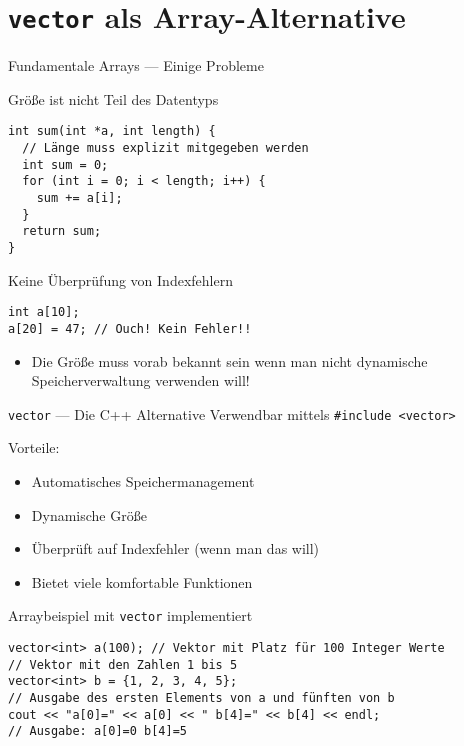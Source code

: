\documentclass[presentation]{beamer}
\begin{document}
\section{\texttt{vector} als Array-Alternative}
\label{sec:org3bbdcd3}
\begin{frame}[label={sec:org098462e},fragile]{Fundamentale Arrays --- Einige Probleme}
 \begin{block}{Größe ist nicht Teil des Datentyps}
\begin{verbatim}
int sum(int *a, int length) {
  // Länge muss explizit mitgegeben werden
  int sum = 0;
  for (int i = 0; i < length; i++) {
    sum += a[i];
  }
  return sum;
}
\end{verbatim}
\end{block}
\begin{block}{Keine Überprüfung von Indexfehlern}
\begin{verbatim}
int a[10];
a[20] = 47; // Ouch! Kein Fehler!!
\end{verbatim}
\end{block}
\begin{itemize}
\item Die Größe muss vorab bekannt sein wenn man nicht dynamische
Speicherverwaltung verwenden will!
\end{itemize}
\end{frame}
\begin{frame}[label={sec:orge58ba32},fragile]{{\color{solarizedYellow}\texttt{vector}} --- Die C++ Alternative}
 Verwendbar mittels {\color{solarizedYellow}\verb!#include <vector>!}

Vorteile:
\begin{itemize}
\item Automatisches Speichermanagement
\item Dynamische Größe
\item Überprüft auf Indexfehler (wenn man das will)
\item Bietet viele komfortable Funktionen
\end{itemize}
\begin{exampleblock}{Arraybeispiel mit {\color{solarizedYellow}\texttt{vector}} implementiert}
\begin{verbatim}
vector<int> a(100); // Vektor mit Platz für 100 Integer Werte
// Vektor mit den Zahlen 1 bis 5
vector<int> b = {1, 2, 3, 4, 5};
// Ausgabe des ersten Elements von a und fünften von b
cout << "a[0]=" << a[0] << " b[4]=" << b[4] << endl;
// Ausgabe: a[0]=0 b[4]=5
\end{verbatim}
\end{exampleblock}
\end{frame}
\end{document}
